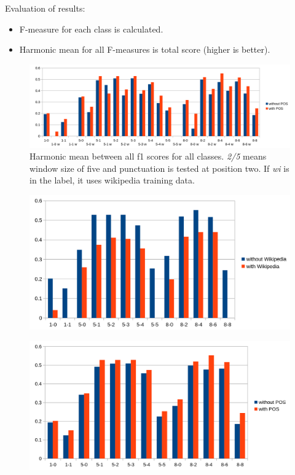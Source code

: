 Evaluation of results:
\begin{itemize}
\item F-measure for each class is calculated.
\item Harmonic mean for all F-measures is total score (higher is better).
\end{itemize}

\begin{figure}[ht]
    \centering
    \includegraphics[width=\textwidth]{img/window_eval.png}
    \caption{Harmonic mean between all f1 scores for all classes. \emph{2/5} means window size of five and punctuation is tested at position two. If \emph{wi} is in the label, it uses wikipedia training data.}
    \label{window_eval}
\end{figure}

\begin{figure}[ht]
    \centering
    \includegraphics[width=\textwidth]{img/window_wiki_eval.png}
    \caption{}
    \label{window_wiki_eval}
\end{figure}

\begin{figure}[ht]
    \centering
    \includegraphics[width=\textwidth]{img/window_pos_eval.png}
    \caption{}
    \label{window_pos_eval}
\end{figure}

